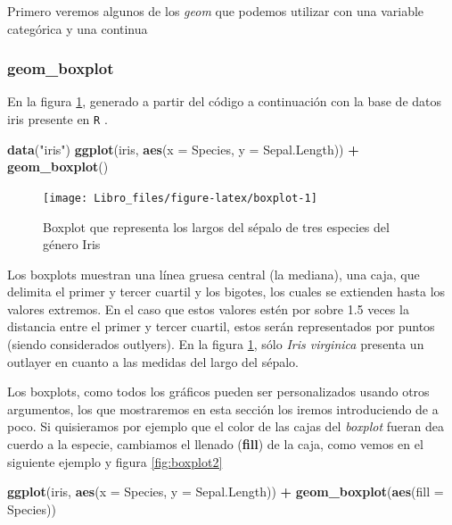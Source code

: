 \documentclass[]{book}
\newenvironment{Shaded}{\begin{snugshade}}{\end{snugshade}}
\newcommand{\DataTypeTok}[1]{\textcolor[rgb]{0.13,0.29,0.53}{#1}}
\newcommand{\KeywordTok}[1]{\textcolor[rgb]{0.13,0.29,0.53}{\textbf{#1}}}
\newcommand{\NormalTok}[1]{#1}
\newcommand{\OperatorTok}[1]{\textcolor[rgb]{0.81,0.36,0.00}{\textbf{#1}}}
\newcommand{\StringTok}[1]{\textcolor[rgb]{0.31,0.60,0.02}{#1}}
\begin{document}
Primero veremos algunos de los \emph{geom} que podemos utilizar con una
variable categórica y una continua

\hypertarget{geom_boxplot}{%
\subsubsection{geom\_boxplot}\label{geom_boxplot}}

En la figura \ref{fig:boxplot}, generado a partir del código a
continuación con la base de datos iris presente en \texttt{R}
\citep{anderson1935irises}.

\begin{Shaded}
\begin{Highlighting}[]
\KeywordTok{data}\NormalTok{(}\StringTok{"iris"}\NormalTok{)}
\KeywordTok{ggplot}\NormalTok{(iris, }\KeywordTok{aes}\NormalTok{(}\DataTypeTok{x =}\NormalTok{ Species, }\DataTypeTok{y =}\NormalTok{ Sepal.Length)) }\OperatorTok{+}\StringTok{ }\KeywordTok{geom_boxplot}\NormalTok{()}
\end{Highlighting}
\end{Shaded}

\begin{figure}

{\centering \texttt{[image: Libro\_files/figure-latex/boxplot-1]} 

}

\caption{Boxplot que representa los largos del sépalo de tres especies del género Iris}\label{fig:boxplot}
\end{figure}

Los boxplots muestran una línea gruesa central (la mediana), una caja,
que delimita el primer y tercer cuartil y los bigotes, los cuales se
extienden hasta los valores extremos. En el caso que estos valores estén
por sobre 1.5 veces la distancia entre el primer y tercer cuartil, estos
serán representados por puntos (siendo considerados outlyers). En la
figura \ref{fig:boxplot}, sólo \emph{Iris virginica} presenta un
outlayer en cuanto a las medidas del largo del sépalo.

Los boxplots, como todos los gráficos pueden ser personalizados usando
otros argumentos, los que mostraremos en esta sección los iremos
introduciendo de a poco. Si quisieramos por ejemplo que el color de las
cajas del \emph{boxplot} fueran dea cuerdo a la especie, cambiamos el
llenado (\textbf{fill}) de la caja, como vemos en el siguiente ejemplo y
figura \ref{fig:boxplot2}

\begin{Shaded}
\begin{Highlighting}[]
\KeywordTok{ggplot}\NormalTok{(iris, }\KeywordTok{aes}\NormalTok{(}\DataTypeTok{x =}\NormalTok{ Species, }\DataTypeTok{y =}\NormalTok{ Sepal.Length)) }\OperatorTok{+}\StringTok{ }\KeywordTok{geom_boxplot}\NormalTok{(}\KeywordTok{aes}\NormalTok{(}\DataTypeTok{fill =}\NormalTok{ Species))}
\end{Highlighting}
\end{Shaded}
\end{document}
